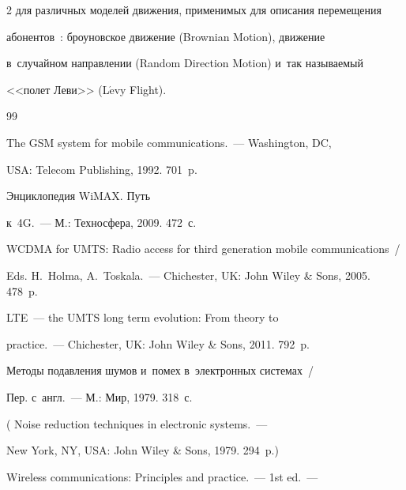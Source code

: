 \begin{multicols}{2}
для различных моделей движения, применимых для описания перемещения 


абонентов~\cite{18-g1}: броуновское движение (Brownian Motion), движение 


в~случайном на\-прав\-ле\-нии (Random Direction Motion) и~так на\-зы\-ва\-емый 


<<полет Леви>> (L$\acute{\mbox{e}}$vy Flight).





{\small\frenchspacing


 {%




 \begin{thebibliography}{99}




 The GSM system for mobile communications.~--- Washington, DC, 


USA: Telecom Publishing, 1992. 701~p.




 Энциклопедия WiMAX. Путь 


к~4G.~--- М.: Техносфера, 2009. 472~с.


 WCDMA for UMTS: Radio access for third generation mobile communications~/


Eds. H.~Holma, A.~Toskala.~--- Chichester, UK: John Wiley \& Sons, 2005. 478~p.




 LTE~--- the UMTS long term evolution: From theory to  


practice.~--- Chichester, UK: John Wiley \& Sons, 2011. 792~p.




 Методы подавления шумов и~помех в~электронных системах~/


Пер. с~англ.~--- М.: Мир, 1979.  318~с.


( {Noise reduction techniques in electronic systems}.~--- 


New York, NY, USA: John Wiley \& Sons, 1979. 294~p.)







 Wireless communications: Principles and practice.~--- 1st ed.~--- 



\end{thebibliography}}}
\end{multicols}
